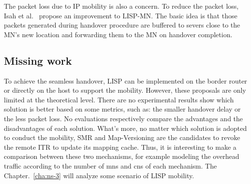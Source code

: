 The packet loss due to IP mobility is also a concern. To reduce the packet loss, Isah et al.~\cite{isah2017towards} propose an improvement to LISP-MN. The basic idea is that those packets generated during handover procedure are buffered to severs close to the MN’s new location and forwarding them to the MN on handover completion.


\subsection{Missing work}
\label{subsec:mobility_missing}
To achieve the seamless handover, LISP can be implemented on the border router or directly on the host to support the mobility. However, these proposals are only limited at the theoretical level. There are no experimental results show which solution is better based on some metrics, such as: the smaller handover delay or the less packet loss. No evaluations respectively compare the advantages and the disadvantages of each solution. What's more, no matter which solution is adopted to conduct the mobility, SMR and Map-Versioning are the candidates to revoke the remote ITR to update its mapping cache. Thus, it is interesting to make a comparison between these two mechanisms, for example modeling the overhead traffic according to the number of \acrshort{mn}s and \acrshort{cn}s of each mechanism. The Chapter.~\ref{cha:ns-3} will analyze some scenario of LISP mobility.


